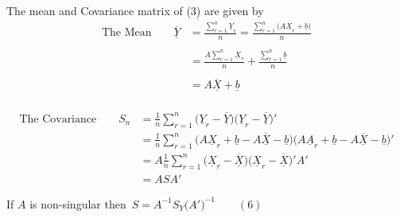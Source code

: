 \documentclass[11pt,a4paper]{article}
\theoremstyle{definition}
\begin{document}
The mean and Covariance matrix of (3) are given by\\

\begin{align*}
\text{The Mean}\qquad  \overline{\underline{Y}} & = \frac{\sum\limits^n_{r=1}\underline{Y}_r}{n}=\frac{\sum\limits^n_{r=1}\big(A\underline{X}_r + \underline{b}\big)}{n}\\\\
 & = \frac{A \sum\limits^n_{r=1}\underline{X}_r}{n}+ \frac{\sum\limits^n_{r=1}\underline{b}}{n}\\\\
 & =  A\underline{\overline{X}} + \underline{b}\tag{4}\\
\end{align*}




\begin{align*}
\text{The Covariance}\qquad  S_n & = \frac{1}{n}\sum^n_{r=1}\big(\underline{Y}_r-\overline{\underline{Y}}\big)\big(\underline{Y}_r-\overline{\underline{Y}}\big)'\\
& = \frac{1}{n}\sum^n_{r=1}\big(A\underline{X}_r+\underline{b}-A\underline{\overline{X}}-\underline{b}\big)\big(A\underline{A}_r+\underline{b}-A\underline{\overline{X}}-\underline{b}\big)'\\
& = A \frac{1}{n}\sum^n_{r=1}\big(\underline{X}_r-\underline{\overline{X}}\big)\big(\underline{X}_r-\overline{\underline{X}}\big)'A'\\
& = ASA'\tag{5}
\end{align*}

If $A$ is non-singular then \,$\displaystyle{S=A^{-1}S_Y\big(A'\big)^{-1}\qquad (6)}$\\
\end{document}
